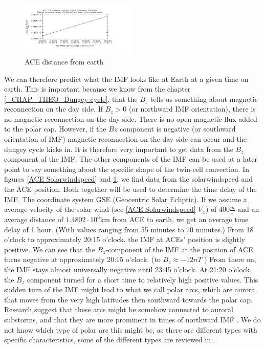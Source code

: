 \documentclass[10pt,a4paper]{article}
\begin{document}
\begin{figure}[h]
\centering
\includegraphics[width=0.5\textwidth]{ACE_distance.pdf}
\caption{ ACE distance from earth \label{ACE distance}}
\end{figure}
We can therefore predict what the IMF looks like at Earth at a given time on earth. This is important because we know from the chapter \ref{_CHAP_THEO_Dungey cycle}, 
that the $B_z$ 
tells us something about magnetic reconnection on the day side. If $B_z>0$ (or northward IMF orientation), there is no magnetic reconnection on the day side. 
There is no open magnetic flux added to the polar cap. However, if the $Bz$ component is negative (or southward orientation of IMF) magnetic reconnection on the day side 
can occur and the dungey cycle kicks in. It is therefore very important to get data from the $B_z$ component of the IMF. The other components of the IMF can be used at a 
later point to say something about the specific shape of the twin-cell convection. In figures \ref{ACE Solarwindspeed} and \ref{ACE distance}, we find data from 
the solarwindspeed and the ACE position. Both together will be used to determine the time delay of the IMF. The coordinate system GSE (Geocentric Solar Ecliptic). 
If we assume a average velocity of the solar wind (see \ref{ACE Solarwindspeed} $V_x$) of $400 \frac{m}{s}$ and an average distance of $1.4802 \cdot 10^{6} \mathrm{km}$ 
from ACE to earth, we get an average time delay of 1 hour. (With values ranging from 55 minutes to 70 minutes.) From 18 o'clock to approximately 20:15 o'clock, 
the IMF at ACEs' position is slightly positive. We can see that the $B_z$-component of the IMF at the position of ACE turns negative at approximately 20:15 o'clock. 
(to $B_z\approx-12 n T$ ) From there on, the IMF stays almost universally negative until 23:45 o'clock. At 21:20 o'clock, the $B_z$ component turned for a short time 
to relatively high positive values. This sudden turn of the IMF might lead to what we call polar arcs, which are aurora that moves from the very high latitudes then 
southward towards the polar cap. Research suggest that these arcs might be somehow connected to auroral substorms, and that they are more prominent in times of northward 
IMF \cite{paper3}. We do not know which type of polar arc this might be, as there are different types with specific characteristics, some of the different types are 
reviewed in \cite{paper4}. 
\end{document}
